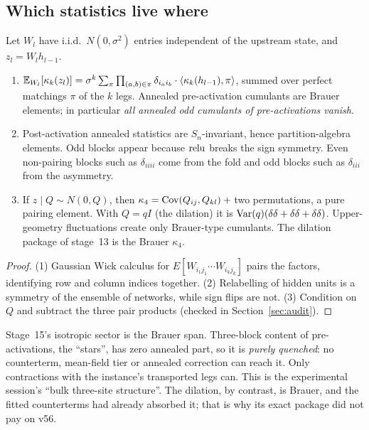 \subsection{Which statistics live where}
\begin{proposition}\label{prop:annealed}
Let $W_l$ have i.i.d.\ $N(0,\sigma^2)$ entries independent of the upstream state, and $z_l=W_lh_{l-1}$.
\begin{enumerate}[leftmargin=*]
\item $\mathbb E_{W_l}[\kappa_k(z_l)]=\sigma^k\sum_\pi\prod_{(a,b)\in\pi}\delta_{i_ai_b}\cdot\langle\kappa_k(h_{l-1}),\pi\rangle$, summed over perfect matchings $\pi$ of the $k$ legs. Annealed
pre-activation cumulants are Brauer elements; in particular \emph{all annealed odd cumulants of pre-activations vanish}.
\item Post-activation annealed statistics are $S_n$-invariant, hence partition-algebra elements. Odd blocks appear because $\operatorname{relu}$
breaks the sign symmetry. Even non-pairing blocks such as $\delta_{iiii}$ come from the fold and odd blocks such as $\delta_{iii}$ from the
asymmetry.
\item If $z\mid Q\sim N(0,Q)$, then $\kappa_4=\operatorname{Cov}(Q_{ij},Q_{kl})+{}$two permutations, a pure pairing element. With $Q=qI$ (the dilation) it is
$\operatorname{Var}(q)(\delta\delta+\delta\delta+\delta\delta)$. Upper-geometry fluctuations create only Brauer-type cumulants. The dilation package of stage~13 is the
Brauer $\kappa_4$.
\end{enumerate}
\end{proposition}
\begin{proof}
(1) Gaussian Wick calculus for $E[W_{i_1j_1}\cdots W_{i_kj_k}]$ pairs the factors, identifying row and column indices together. (2) Relabelling
of hidden units is a symmetry of the ensemble of networks, while sign flips are not. (3) Condition on $Q$ and subtract the three pair
products (checked in Section~\ref{sec:audit}).
\end{proof}
\begin{corollary}
Stage~15's isotropic sector is the Brauer span. Three-block content of pre-activations, the ``stars'', has zero annealed part, so it is
\emph{purely quenched}: no counterterm, mean-field tier or annealed correction can reach it. Only contractions with the instance's
transported legs can. This is the experimental session's ``bulk three-site structure''. The dilation, by contrast, is Brauer, and the
fitted counterterms had already absorbed it; that is why its exact package did not pay on v56.
\end{corollary}


